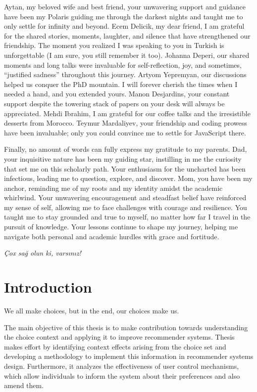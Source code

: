 \documentclass[a4paper,12pt]{article}
\begin{document}
Aytan, my beloved wife and best friend, your unwavering support and guidance have been my Polaris guiding me through the darkest nights and taught me to only settle for infinity and beyond. Ecem Delicik, my dear friend, I am grateful for the shared stories, moments, laughter, and silence that have strengthened our friendship. The moment you realized I was speaking to you in Turkish is unforgettable (I am sure, you still remember it too). Johanna Deperi, our shared moments and long talks were invaluable for self-reflection, joy, and sometimes, ``justified sadness'' throughout this journey. Artyom Yepremyan, our discussions helped us conquer the PhD mountain. I will forever cherish the times when I needed a hand, and you extended yours. Manon Desjardins, your constant support despite the towering stack of papers on your desk will always be appreciated. Mehdi Ibrahim, I am grateful for our coffee talks and the irresistible desserts from Morocco. Teymur Mardaliyev, your friendship and coding prowess have been invaluable; only you could convince me to settle for JavaScript there.

Finally, no amount of words can fully express my gratitude to my parents. Dad, your inquisitive nature has been my guiding star, instilling in me the curiosity that set me on this scholarly path. Your enthusiasm for the uncharted has been infectious, leading me to question, explore, and discover. Mom, you have been my anchor, reminding me of my roots and my identity amidst the academic whirlwind. Your unwavering encouragement and steadfast belief have reinforced my sense of self, allowing me to face challenges with courage and resilience. You taught me to stay grounded and true to myself, no matter how far I travel in the pursuit of knowledge. Your lessons continue to shape my journey, helping me navigate both personal and academic hurdles with grace and fortitude. 

\textit{Çox sağ olun ki, varsınız!}



\clearpage
\tableofcontents
\newpage
\listoffigures
\clearpage
\listoftables
\newpage


\newpage
\section{Introduction}

\epigraph{We all make choices, but in the end, our choices make us.}{}


The main objective of this thesis is to make contribution towards understanding the choice context and applying it to improve recommender systems. Thesis makes effort by identifying context effects arising from the choice set and developing a methodology to implement this information in recommender systems design. Furthermore, it analyzes the effectiveness of user control mechanisms, which allow individuals to inform the system about their preferences and also amend them.
\end{document}

